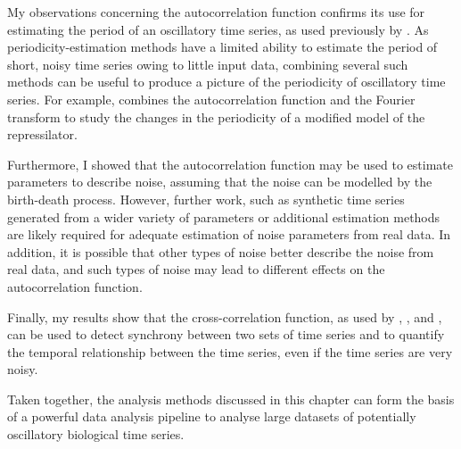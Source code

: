 My observations concerning the autocorrelation function confirms its use for estimating the period of an oscillatory time series, as used previously by \textcite{papagiannakisAutonomousMetabolicOscillations2017}.
As periodicity-estimation methods have a limited ability to estimate the period of short, noisy time series owing to little input data, combining several such methods can be useful to produce a picture of the periodicity of oscillatory time series.
For example, \textcite{potvin-trottierSynchronousLongtermOscillations2016} combines the autocorrelation function and the Fourier transform to study the changes in the periodicity of a modified model of the repressilator.

Furthermore, I showed that the autocorrelation function may be used to estimate parameters to describe noise, assuming that the noise can be modelled by the birth-death process.
However, further work, such as synthetic time series generated from a wider variety of parameters or additional estimation methods are likely required for adequate estimation of noise parameters from real data.
In addition, it is possible that other types of noise better describe the noise from real data, and such types of noise may lead to different effects on the autocorrelation function.

Finally, my results show that the cross-correlation function, as used by \textcite{dunlopRegulatoryActivityRevealed2008}, \textcite{kivietStochasticityMetabolismGrowth2014}, and \textcite{pietschDeterminingGrowthRates2023}, can be used to detect synchrony between two sets of time series and to quantify the temporal relationship between the time series, even if the time series are very noisy.

Taken together, the analysis methods discussed in this chapter can form the basis of a powerful data analysis pipeline to analyse large datasets of potentially oscillatory biological time series.
